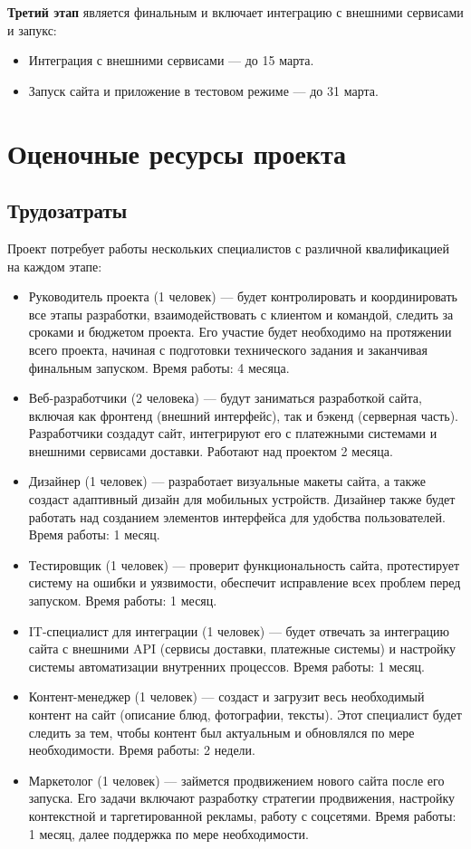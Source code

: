 \textbf{Третий этап} является финальным
и включает интеграцию с внешними сервисами и запукс:

\begin{itemize}
	\item Интеграция с внешними сервисами --- до 15 марта.
	\item Запуск сайта и приложение в тестовом режиме --- до 31 марта.
\end{itemize}

\section{Оценочные ресурсы проекта}

\subsection{Трудозатраты}

Проект потребует работы нескольких специалистов с различной квалификацией на каждом этапе:

\begin{itemize}
	\item Руководитель проекта (1 человек) --- будет контролировать
		и координировать все этапы разработки,
		взаимодействовать с клиентом и командой,
		следить за сроками и бюджетом проекта.
		Его участие будет необходимо на протяжении всего проекта,
		начиная с подготовки технического задания
		и заканчивая финальным запуском. Время работы: 4 месяца.
	\item Веб-разработчики (2 человека) --- будут заниматься разработкой сайта,
		включая как фронтенд (внешний интерфейс),
		так и бэкенд (серверная часть).
		Разработчики создадут сайт, интегрируют его с платежными системами
		и внешними сервисами доставки. Работают над проектом 2 месяца.
	\item Дизайнер (1 человек) --- разработает визуальные макеты сайта,
		а также создаст адаптивный дизайн для мобильных устройств.
		Дизайнер также будет работать над созданием элементов интерфейса
		для удобства пользователей. Время работы: 1 месяц.
	\item Тестировщик (1 человек) --- проверит функциональность сайта,
		протестирует систему на ошибки и уязвимости,
		обеспечит исправление всех проблем перед запуском.
		Время работы: 1 месяц.
	\item IT-специалист для интеграции (1 человек) --- будет отвечать
		за интеграцию сайта с внешними API
		(сервисы доставки, платежные системы)
		и настройку системы автоматизации внутренних процессов.
		Время работы: 1 месяц.
	\item Контент-менеджер (1 человек) --- создаст
		и загрузит весь необходимый контент на сайт
		(описание блюд, фотографии, тексты).
		Этот специалист будет следить за тем,
		чтобы контент был актуальным и обновлялся по мере необходимости.
		Время работы: 2 недели.
	\item Маркетолог (1 человек) --- займется продвижением
		нового сайта после его запуска.
		Его задачи включают разработку стратегии продвижения,
		настройку контекстной и таргетированной рекламы, работу с соцсетями.
		Время работы: 1 месяц, далее поддержка по мере необходимости.
\end{itemize}

